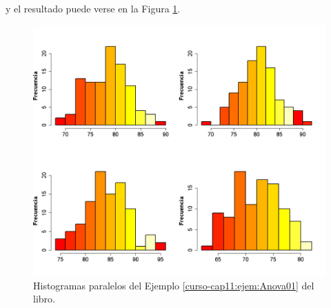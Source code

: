 \documentclass[10pt,a4paper]{article}\usepackage[]{graphicx}\usepackage[]{color}
\begin{document}
y el resultado puede verse en la Figura \ref{tut11:fig:HistogramasParalelosEjemploAnova}.
\begin{figure}[htb]
\begin{center}
    \includegraphics[width=14cm]{../fig/Tut11-02.png}
\end{center}
\caption{Histogramas paralelos del Ejemplo \ref{curso-cap11:ejem:Anova01} del libro.}
\label{tut11:fig:HistogramasParalelosEjemploAnova}
\end{figure}
\end{document}
